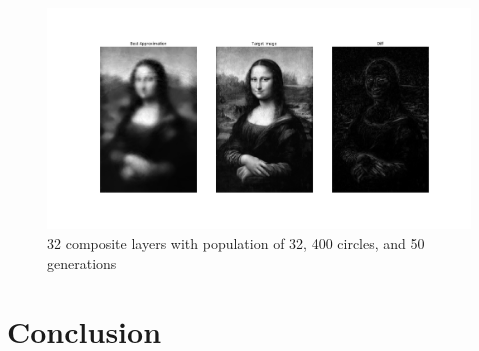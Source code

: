 \documentclass{article}
\begin{document}
\begin{figure}[H]
    \centering
    \includegraphics[width=\textwidth]{output/average32_c400p32g50.png}
    \caption{32 composite layers with population of 32, 400 circles, and 50 generations}\label{fig:composite-32}
\end{figure}

\section{Conclusion}

\end{document}
